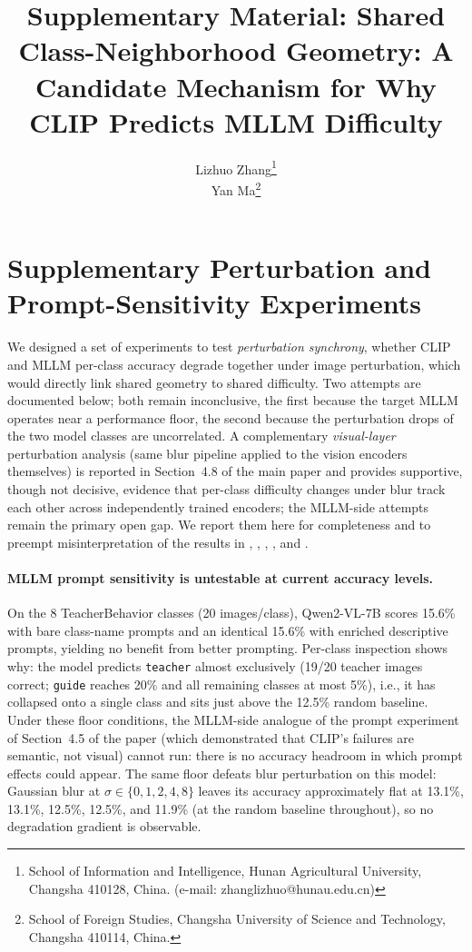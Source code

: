 \documentclass[11pt,a4paper]{article}
\title{Supplementary Material: Shared Class-Neighborhood Geometry: A Candidate Mechanism for Why CLIP Predicts MLLM Difficulty}
\author{
  Lizhuo Zhang\thanks{School of Information and Intelligence, Hunan Agricultural University, Changsha 410128, China. (e-mail: zhanglizhuo@hunau.edu.cn)} \\
  Yan Ma\thanks{School of Foreign Studies, Changsha University of Science and Technology, Changsha 410114, China.}
}
\begin{document}
\renewcommand{\thetable}{S\arabic{table}}
\renewcommand{\thefigure}{S\arabic{figure}}

\maketitle

\section*{Supplementary Perturbation and Prompt-Sensitivity Experiments}
\label{sec:perturb_appendix}

We designed a set of experiments to test \emph{perturbation synchrony}, whether CLIP and MLLM per-class accuracy degrade together under image perturbation, which would directly link shared geometry to shared difficulty. Two attempts are documented below; both remain inconclusive, the first because the target MLLM operates near a performance floor, the second because the perturbation drops of the two model classes are uncorrelated. A complementary \emph{visual-layer} perturbation analysis (same blur pipeline applied to the vision encoders themselves) is reported in Section~4.8 of the main paper and provides supportive, though not decisive, evidence that per-class difficulty changes under blur track each other across independently trained encoders; the MLLM-side attempts remain the primary open gap. We report them here for completeness and to preempt misinterpretation of the results in , , , , and .

\paragraph{MLLM prompt sensitivity is untestable at current accuracy levels.}
On the 8 TeacherBehavior classes (20 images/class), Qwen2-VL-7B scores 15.6\% with bare class-name prompts and an identical 15.6\% with enriched descriptive prompts, yielding no benefit from better prompting. Per-class inspection shows why: the model predicts \texttt{teacher} almost exclusively (19/20 teacher images correct; \texttt{guide} reaches 20\% and all remaining classes at most 5\%), i.e., it has collapsed onto a single class and sits just above the 12.5\% random baseline. Under these floor conditions, the MLLM-side analogue of the prompt experiment of Section~4.5 of the paper (which demonstrated that CLIP's failures are semantic, not visual) cannot run: there is no accuracy headroom in which prompt effects could appear. The same floor defeats blur perturbation on this model: Gaussian blur at $\sigma \in \{0,1,2,4,8\}$ leaves its accuracy approximately flat at 13.1\%, 13.1\%, 12.5\%, 12.5\%, and 11.9\% (at the random baseline throughout), so no degradation gradient is observable.
\end{document}
